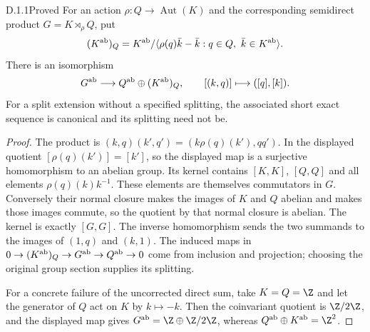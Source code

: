 \begin{idstatement}{D.1.1}{Proved}\label{st:D.1.1}
For an action $\rho:Q\to\operatorname{Aut}(K)$ and the corresponding
semidirect product $G=K\rtimes_\rho Q$, put
\[
(K^{\rm ab})_Q=K^{\rm ab}/
\langle\rho(q)\bar k-\bar k:q\in Q,\ \bar k\in K^{\rm ab}\rangle.
\]
There is an isomorphism
\[
G^{\rm ab}\longrightarrow Q^{\rm ab}\oplus(K^{\rm ab})_Q,
\qquad [(k,q)]\longmapsto([q],[k]).
\]
For a split extension without a specified splitting, the associated
short exact sequence is canonical and its splitting need not be.
\end{idstatement}
\begin{proof}
The product is $(k,q)(k',q')=(k\rho(q)(k'),qq')$.
In the displayed quotient $[\rho(q)(k')]=[k']$, so the displayed map
is a surjective homomorphism to an abelian group. Its kernel contains
$[K,K]$, $[Q,Q]$ and all elements $\rho(q)(k)k^{-1}$.
These elements are themselves commutators in $G$. Conversely their
normal closure makes the images of $K$ and $Q$ abelian and makes
those images commute, so the quotient by that normal closure is
abelian. The kernel is exactly $[G,G]$. The inverse homomorphism
sends the two summands to the images of $(1,q)$ and $(k,1)$.
The induced maps in
$0\to(K^{\rm ab})_Q\to G^{\rm ab}\to Q^{\rm ab}\to0$
come from inclusion and projection; choosing the original group
section supplies its splitting.

For a concrete failure of the uncorrected direct sum, take
$K=Q=\Z$ and let the generator of $Q$ act on $K$ by $k\mapsto-k$.
Then the coinvariant quotient is $\Z/2\Z$, and the displayed map
gives $G^{\rm ab}=\Z\oplus\Z/2\Z$, whereas
$Q^{\rm ab}\oplus K^{\rm ab}=\Z^2$.
\end{proof}



